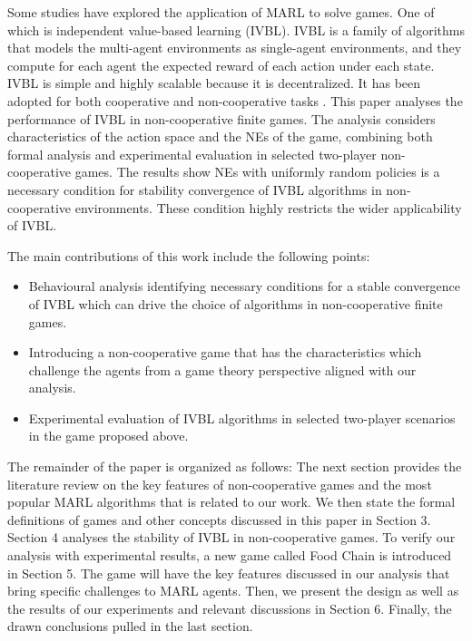 \documentclass[]{interact}
\theoremstyle{plain}%
\theoremstyle{definition}
\theoremstyle{remark}
\begin{document}
Some studies have explored the application of MARL to solve games. One of which is independent value-based learning (IVBL). IVBL is a family of algorithms that models the multi-agent environments as single-agent environments, and they compute for each agent the expected reward of each action under each state. IVBL is simple and highly scalable because it is decentralized. It has been adopted for both cooperative \cite{foerster2017stabilising, omidshafiei2017deep, palmer2017lenient, palmer2018negative} and non-cooperative tasks \cite{bjornsson2009cadiaplayer, jiang2018q, qu2020distributed, kopacz2023evaluating}. This paper analyses the performance of IVBL in non-cooperative finite games. The analysis considers characteristics of the action space and the NEs of the game, combining both formal analysis and experimental evaluation in selected two-player non-cooperative games. The results show NEs with uniformly random policies is a necessary condition for stability convergence of IVBL algorithms in non-cooperative environments. These condition highly restricts the wider applicability of IVBL.

The main contributions of this work include the following points:
\begin{itemize}
    \item Behavioural analysis identifying necessary conditions for a stable convergence of IVBL which can drive the choice of algorithms in non-cooperative finite games.
    \item Introducing a non-cooperative game that has the characteristics which challenge the agents from a game theory perspective aligned with our analysis.
    \item Experimental evaluation of IVBL algorithms in selected two-player scenarios in the game proposed above.
\end{itemize}

The remainder of the paper is organized as follows:
The next section provides the literature review on the key features of non-cooperative games and the most popular MARL algorithms that is related to our work. We then state the formal definitions of games and other concepts discussed in this paper in Section 3. Section 4 analyses the stability of IVBL in non-cooperative games. To verify our analysis with experimental results, a new game called Food Chain is introduced in Section 5. The game will have the key features discussed in our analysis that bring specific challenges to MARL agents. Then, we present the design as well as the results of our experiments and relevant discussions in Section 6. Finally, the drawn conclusions pulled in the last section.
\end{document}
